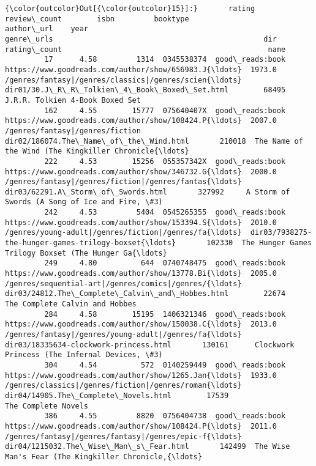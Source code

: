 \documentclass[11pt]{article}
\begin{document}
\begin{Verbatim}[commandchars=\\\{\}]
{\color{outcolor}Out[{\color{outcolor}15}]:}       rating review\_count        isbn         booktype                                         author\_url    year                                         genre\_urls                                                dir rating\_count                                               name
         17      4.58         1314  0345538374  good\_reads:book  https://www.goodreads.com/author/show/656983.J{\ldots}  1973.0  /genres/fantasy|/genres/classics|/genres/scien{\ldots}       dir01/30.J\_R\_R\_Tolkien\_4\_Book\_Boxed\_Set.html        68495                    J.R.R. Tolkien 4-Book Boxed Set
         162     4.55        15777  075640407X  good\_reads:book  https://www.goodreads.com/author/show/108424.P{\ldots}  2007.0                    /genres/fantasy|/genres/fiction             dir02/186074.The\_Name\_of\_the\_Wind.html       210018  The Name of the Wind (The Kingkiller Chronicle{\ldots}
         222     4.53        15256  055357342X  good\_reads:book  https://www.goodreads.com/author/show/346732.G{\ldots}  2000.0  /genres/fantasy|/genres/fiction|/genres/fantas{\ldots}                 dir03/62291.A\_Storm\_of\_Swords.html       327992     A Storm of Swords (A Song of Ice and Fire, \#3)
         242     4.53         5404  0545265355  good\_reads:book  https://www.goodreads.com/author/show/153394.S{\ldots}  2010.0  /genres/young-adult|/genres/fiction|/genres/fa{\ldots}  dir03/7938275-the-hunger-games-trilogy-boxset{\ldots}       102330  The Hunger Games Trilogy Boxset (The Hunger Ga{\ldots}
         249     4.80          644  0740748475  good\_reads:book  https://www.goodreads.com/author/show/13778.Bi{\ldots}  2005.0  /genres/sequential-art|/genres/comics|/genres/{\ldots}    dir03/24812.The\_Complete\_Calvin\_and\_Hobbes.html        22674                     The Complete Calvin and Hobbes
         284     4.58        15195  1406321346  good\_reads:book  https://www.goodreads.com/author/show/150038.C{\ldots}  2013.0  /genres/fantasy|/genres/young-adult|/genres/fa{\ldots}             dir03/18335634-clockwork-princess.html       130161      Clockwork Princess (The Infernal Devices, \#3)
         304     4.54          572  0140259449  good\_reads:book  https://www.goodreads.com/author/show/1265.Jan{\ldots}  1933.0  /genres/classics|/genres/fiction|/genres/roman{\ldots}               dir04/14905.The\_Complete\_Novels.html        17539                                The Complete Novels
         386     4.55         8820  0756404738  good\_reads:book  https://www.goodreads.com/author/show/108424.P{\ldots}  2011.0  /genres/fantasy|/genres/fantasy|/genres/epic-f{\ldots}             dir04/1215032.The\_Wise\_Man\_s\_Fear.html       142499  The Wise Man's Fear (The Kingkiller Chronicle,{\ldots}

\end{Verbatim}
\end{document}
